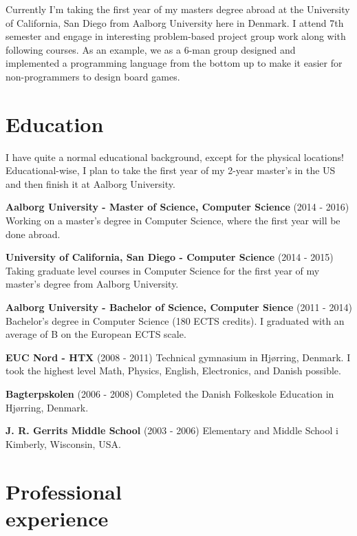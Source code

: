 \documentclass[margin,line,a4paper]{resume}
\begin{document}
\begin{resume}
    Currently I'm taking the first year of my masters degree abroad at
    the University of California, San Diego from Aalborg University
    here in Denmark. I attend 7th semester and engage in interesting
    problem-based project group work along with following courses.
    As an example, we as a 6-man group designed and implemented a
    programming language from the bottom up to make it easier for
    non-programmers to design board games. 

    \section{\mysidestyle Education}
    I have quite a normal educational background, except for the
    physical locations! Educational-wise, I plan to take the first year of
    my 2-year master's in the US and then finish it at Aalborg University.

    \textbf{Aalborg University - Master of Science, Computer Science}
    (2014 - 2016) Working on a master's degree in Computer
    Science, where the first year will be done abroad.

    \textbf{University of California, San Diego - Computer Science}
    (2014 - 2015) Taking graduate level courses in Computer Science for the
    first year of my master's degree from Aalborg University.

    \textbf{Aalborg University - Bachelor of Science, Computer Sience}
    (2011 - 2014) Bachelor's degree in Computer Science (180 ECTS
    credits). I graduated with an average of B on the European ECTS
    scale.      

    \textbf{EUC Nord - HTX} (2008 - 2011) Technical gymnasium in
    Hjørring, Denmark. I took the highest level Math, Physics, English,
    Electronics, and Danish possible.
    
    \textbf{Bagterpskolen} (2006 - 2008) Completed the Danish
    Folkeskole Education in Hjørring, Denmark.

    \textbf{J. R. Gerrits Middle School} (2003 - 2006) Elementary and 
    Middle School i Kimberly, Wisconsin, USA.

\pagebreak
\section{\mysidestyle Professional\\experience}\vspace{1mm}
\begin{description}


\end{description}
\end{resume}
\end{document}
